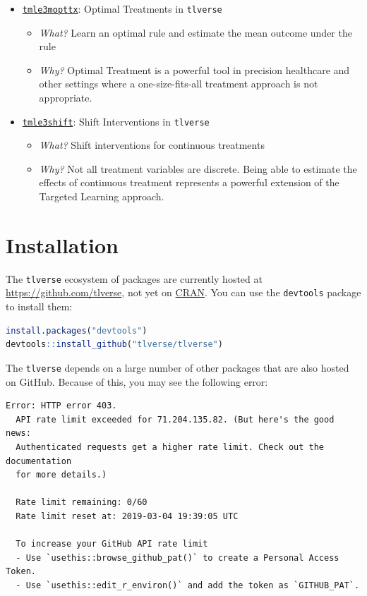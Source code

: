 \documentclass[
  12pt, krantz2,
]{book}
\newcommand{\passthrough}[1]{#1}
\providecommand{\tightlist}{%
  \setlength{\itemsep}{0pt}\setlength{\parskip}{0pt}}
\theoremstyle{definition}
\theoremstyle{definition}
\theoremstyle{definition}
\newcommand{\1}{\mathbbm{1}}
\begin{document}
\begin{itemize}
\tightlist
\item
  \href{https://github.com/tlverse/tmle3mopttx}{\passthrough{\lstinline!tmle3mopttx!}}: Optimal Treatments
  in \passthrough{\lstinline!tlverse!}

  \begin{itemize}
  \tightlist
  \item
    \emph{What?} Learn an optimal rule and estimate the mean outcome under the rule
  \item
    \emph{Why?} Optimal Treatment is a powerful tool in precision healthcare and
    other settings where a one-size-fits-all treatment approach is not
    appropriate.
  \end{itemize}
\item
  \href{https://github.com/tlverse/tmle3shift}{\passthrough{\lstinline!tmle3shift!}}: Shift Interventions in
  \passthrough{\lstinline!tlverse!}

  \begin{itemize}
  \tightlist
  \item
    \emph{What?} Shift interventions for continuous treatments
  \item
    \emph{Why?} Not all treatment variables are discrete. Being able to estimate the
    effects of continuous treatment represents a powerful extension of the
    Targeted Learning approach.
  \end{itemize}
\end{itemize}

\hypertarget{installtlverse}{%
\section{Installation}\label{installtlverse}}

The \passthrough{\lstinline!tlverse!} ecosystem of packages are currently hosted at
\url{https://github.com/tlverse}, not yet on \href{http://cran.r-project.org/}{CRAN}. You
can use the \passthrough{\lstinline!devtools!} package to install them:

\begin{lstlisting}[language=R]
install.packages("devtools")
devtools::install_github("tlverse/tlverse")
\end{lstlisting}

The \passthrough{\lstinline!tlverse!} depends on a large number of other packages that are also hosted
on GitHub. Because of this, you may see the following error:

\begin{lstlisting}
Error: HTTP error 403.
  API rate limit exceeded for 71.204.135.82. (But here's the good news:
  Authenticated requests get a higher rate limit. Check out the documentation
  for more details.)

  Rate limit remaining: 0/60
  Rate limit reset at: 2019-03-04 19:39:05 UTC

  To increase your GitHub API rate limit
  - Use `usethis::browse_github_pat()` to create a Personal Access Token.
  - Use `usethis::edit_r_environ()` and add the token as `GITHUB_PAT`.
\end{lstlisting}
\end{document}
